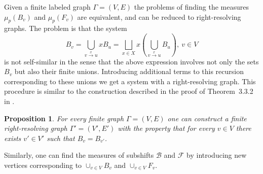 \documentclass[12pt]{article}
\newcommand{\gr}{\Gamma}
\newcommand{\B}{\mathscr{B}}
\newcommand{\F}{\mathscr{F}}
\newtheorem{prop}[theor]{Proposition}
\theoremstyle{definition}
\newtheorem{example}{Example}
\begin{document}
Given a finite labeled graph $\gr=(V,E)$ the problems of finding the measures $\mu_p(B_v)$ and
$\mu_p(F_v)$ are equivalent, and can be reduced to right-resolving graphs. The problem is that the
system
\[
B_v=\bigcup_{v\stackrel{x}\rightarrow u} xB_{u}=\bigsqcup_{x\in
X}x\left(\bigcup_{v\stackrel{x}\rightarrow u} B_{u}\right),\ v\in V
\]
is not self-similar in the sense that the above expression involves not only the sets $B_v$ but
also their finite unions. Introducing additional terms to this recursion corresponding to these
unions we get a system with a right-resolving graph. This procedure is similar to the construction
described in the proof of Theorem~3.3.2 in \cite{IntroSymbDyn}.


\begin{prop}
For every finite graph $\gr=(V,E)$ one can construct a finite right-resolving graph $\gr'=(V',E')$
with the property that for every $v\in V$ there exists $v'\in V'$ such that $B_v=B_{v'}$.
\end{prop}
%


Similarly, one can find the measures of subshifts $\B$ and $\F$ by introducing new vertices
corresponding to $\cup_{v\in V} B_v$ and $\cup_{v\in V} F_v$.

\end{document}
